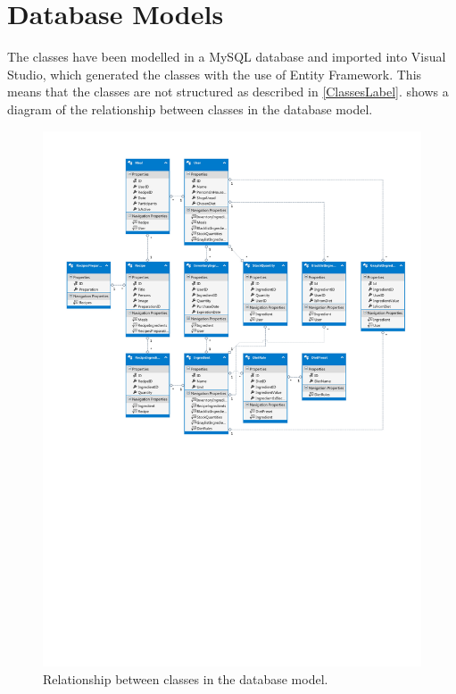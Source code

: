 \section{Database Models} \label{DataBaseModel/Classes}
The classes have been modelled in a MySQL database and imported into Visual Studio, which generated the classes with the use of Entity Framework. This means that the classes are not structured as described in \cref{ClassesLabel}.  shows a diagram of the relationship between classes in the database model.

\begin{figure}[H]
	\centering
    \includegraphics[width=1\textwidth, trim=0 350 0 0]{Grafik/FoodDatabase.pdf}
	\caption{Relationship between classes in the database model.}
	\label{DatabaseModel}
\end{figure}

